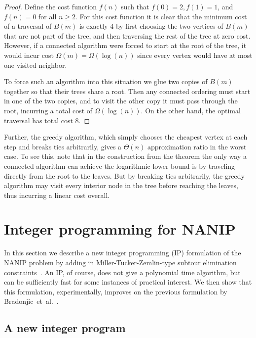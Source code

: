 \documentclass[english]{llncs}
\begin{document}
\begin{proof}
Define the cost function $f(n)$ such that $f(0) = 2, f(1) = 1$, and $f(n) = 0$
for all $n \geq 2$. For this cost function it is clear that the minimum cost of
a traversal of $B(m)$ is exactly 4 by first choosing the two vertices of $B(m)$
that are not part of the tree, and then traversing the rest of the tree at zero
cost. However, if a connected algorithm were forced to start at the root of the
tree, it would incur cost $\Omega(m) = \Omega(\log(n))$ since every vertex
would have at most one visited neighbor. 

To force such an algorithm into this situation we glue two copies of $B(m)$
together so that their trees share a root. Then any connected ordering must
start in one of the two copies, and to visit the other copy it must pass
through the root, incurring a total cost of $\Omega(\log(n))$. On the other
hand, the optimal traversal has total cost 8. 

\end{proof}

Further, the greedy algorithm, which simply chooses the cheapest vertex at each
step and breaks ties arbitrarily, gives a $\Theta(n)$ approximation ratio in
the worst case. To see this, note that in the construction from the theorem the
only way a connected algorithm can achieve the logarithmic lower bound is by
traveling directly from the root to the leaves. But by breaking ties
arbitrarily, the greedy algorithm may visit every interior node in the tree
before reaching the leaves, thus incurring a linear cost overall.



\section{Integer programming for NANIP}\label{section:IP}

In this section we describe a new integer programming (IP) formulation of the
NANIP problem by adding in Miller-Tucker-Zemlin-type subtour elimination
constraints~\cite{miller1960integer}.  An IP, of course, does not give a
polynomial time algorithm, but can be sufficiently fast for some instances of
practical interest.  We then show that this formulation, experimentally,
improves on the previous formulation by Bradonjic~et~al.~\cite{Gutfraind14}.

\subsection{A new integer program}
\end{document}
